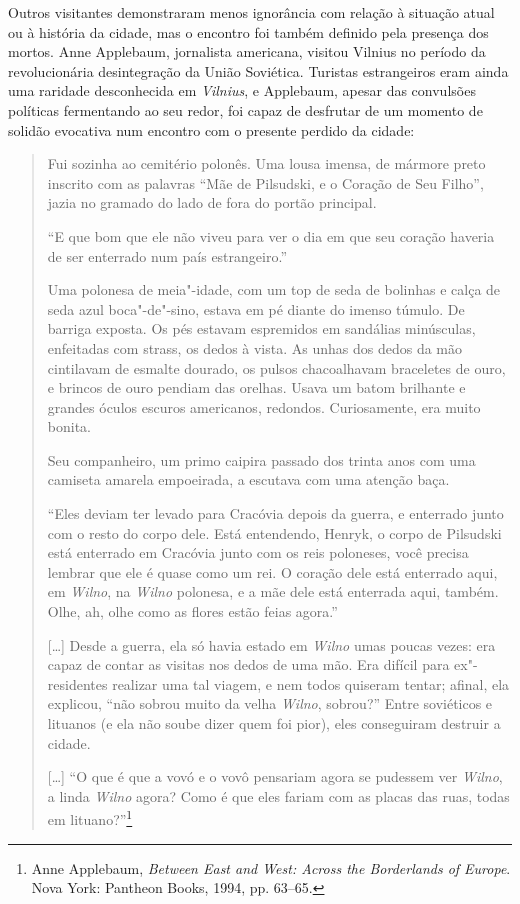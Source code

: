 Outros visitantes demonstraram menos ignorância com relação à situação
atual ou à história da cidade, mas o encontro foi também definido pela
presença dos mortos. Anne Applebaum, jornalista americana, visitou
Vilnius no período da revolucionária desintegração da União Soviética.
Turistas estrangeiros eram ainda uma raridade desconhecida em \textit{Vilnius}, e
Applebaum, apesar das convulsões políticas fermentando ao seu redor, foi
capaz de desfrutar de um momento de solidão evocativa num encontro com o
presente perdido da cidade:

\begin{quote}
Fui sozinha ao cemitério polonês. Uma lousa imensa, de mármore preto
inscrito com as palavras ``Mãe de Pilsudski, e o Coração de Seu Filho'',
jazia no gramado do lado de fora do portão principal.

``E que bom que ele não viveu para ver o dia em que seu coração haveria
de ser enterrado num país estrangeiro.''

Uma polonesa de meia"-idade, com um top de seda de bolinhas e calça de
seda azul boca"-de"-sino, estava em pé diante do imenso túmulo. De barriga
exposta. Os pés estavam espremidos em sandálias minúsculas, enfeitadas
com strass, os dedos à vista. As unhas dos dedos da mão cintilavam de
esmalte dourado, os pulsos chacoalhavam braceletes de ouro, e brincos de
ouro pendiam das orelhas. Usava um batom brilhante e grandes óculos
escuros americanos, redondos. Curiosamente, era muito bonita.

Seu companheiro, um primo caipira passado dos trinta anos com uma
camiseta amarela empoeirada, a escutava com uma atenção baça.

``Eles deviam ter levado para Cracóvia depois da guerra, e enterrado
junto com o resto do corpo dele. Está entendendo, Henryk, o corpo de
Pilsudski está enterrado em Cracóvia junto com os reis poloneses, você
precisa lembrar que ele é quase como um rei. O coração dele está
enterrado aqui, em \textit{Wilno}, na \textit{Wilno} polonesa, e a mãe dele está enterrada
aqui, também. Olhe, ah, olhe como as flores estão feias agora.''

[\ldots{}] Desde a guerra, ela só havia estado em \textit{Wilno} umas poucas vezes:
era capaz de contar as visitas nos dedos de uma mão. Era difícil para
ex"-residentes realizar uma tal viagem, e nem todos quiseram tentar;
afinal, ela explicou, ``não sobrou muito da velha \textit{Wilno}, sobrou?'' Entre
soviéticos e lituanos (e ela não soube dizer quem foi pior), eles
conseguiram destruir a cidade.

[\ldots{}] ``O que é que a vovó e o vovô pensariam agora se pudessem ver
\textit{Wilno}, a linda \textit{Wilno} agora? Como é que eles fariam com as placas das
ruas, todas em lituano?''\footnote{Anne Applebaum, \textit{Between East and West: Across the Borderlands of Europe}. Nova York: Pantheon Books, 1994, pp. 63--65.}
\end{quote}

